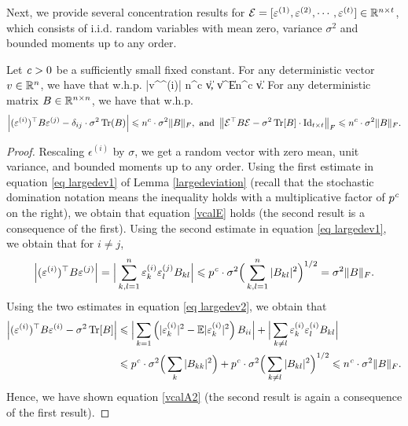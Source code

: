 Next, we provide several concentration results for $\mathcal E=[\varepsilon^{(1)},\varepsilon^{(2)},\cdots, \varepsilon^{(t)}]\in \mathbb{R}^{n\times t}$, which consists of i.i.d. random variables with mean zero, variance $\sigma^2$ and bounded moments up to any order.
 
\begin{corollary}\label{cor_calE}
Let ${\mathit{c}}>0$ be a sufficiently small fixed constant.
For any deterministic vector $v\in \mathbb{R}^n$, we have that w.h.p.
\be\label{vcalE}
	|v^\top \epsilon^{(i)}| \le n^{c} \cdot \sigma \|v\|,  \|v^\top \cal E\| \le n^{c} \cdot \sigma  \|v\|.
\ee
For any deterministic matrix $B \in \mathbb{R}^{n\times n}$, we have that w.h.p.
\begin{align}\label{vcalA2}
	\left|(\varepsilon^{(i)})^\top B \varepsilon^{(j)} - \delta_{ij}\cdot \sigma^2 \operatorname{Tr}(B)\right| \leqslant n^{c}\cdot \sigma^2 \|B\|_F, \text{ and }
	\left\| \mathcal E^\top B \mathcal E - \sigma^2 \operatorname{Tr}[B]\cdot \operatorname{Id}_{t\times t}\right\|_F \leqslant n^{c} \cdot  \sigma^2\|B\|_F.
\end{align}
\end{corollary}
\begin{proof}
Rescaling $\epsilon^{(i)}$ by $\sigma$, we get a random vector with zero mean, unit variance, and bounded moments up to any order.
Using the first estimate in equation \eqref{eq largedev1} of Lemma \ref{largedeviation} (recall that the stochastic domination notation means the inequality holds with a multiplicative factor of $p^{{\mathit{c}}}$ on the right), we obtain that equation \eqref{vcalE} holds (the second result is a consequence of the first).
Using the second estimate in equation \eqref{eq largedev1}, we obtain that for $i\ne j$,
 \begin{align*}
\left|(\varepsilon^{(i)})^\top B \varepsilon^{(j)}\right| = \Big|\sum_{k,l=1}^n \varepsilon^{(i)}_k\varepsilon^{(j)}_l B_{kl} \Big| \leqslant p^{{\mathit{c}}} \cdot \sigma^2 \Big(\sum_{k,l=1}^n|B_{kl}|^2\Big)^{1/2}=\sigma^2 \|B\|_F.
 \end{align*}
Using the two estimates in equation \eqref{eq largedev2}, we obtain that 
\begin{align*}
\left|(\varepsilon^{(i)})^\top B \varepsilon^{(i)} - \sigma^2 \operatorname{Tr}[B]\right| &\leqslant \Big| \sum_{k=1} \left(|\varepsilon^{(i)}_k|^2-\mathbb{E}|\varepsilon^{(i)}_k|^2\right)B_{ii} \Big|+\Big| \sum_{ k\ne l } \varepsilon^{(i)}_k \varepsilon^{(i)}_l B_{kl} \Big| \\
&\leqslant p^{{\mathit{c}}}\cdot \sigma^2 \Big( \sum_{k}|B_{kk}|^2\Big)+ p^{{\mathit{c}}}\cdot \sigma^2 \Big( \sum_{k\ne l}|B_{kl}|^2\Big)^{1/2}\leqslant n^{{\mathit{c}}}\cdot\sigma^2 \|B\|_F.
\end{align*}
Hence, we have shown equation \eqref{vcalA2} (the second result is again a consequence of the first result).
\end{proof}
